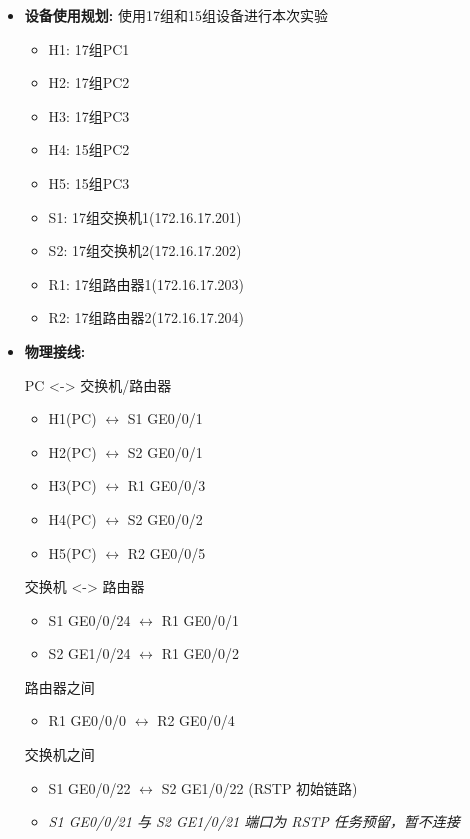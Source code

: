 \documentclass[12pt, a4paper]{article}
\begin{document}
\begin{itemize}
    \item \textbf{设备使用规划:}
    使用17组和15组设备进行本次实验
    \begin{itemize}
        \item H1: 17组PC1
        \item H2: 17组PC2
        \item H3: 17组PC3
        \item H4: 15组PC2
        \item H5: 15组PC3
        \item S1: 17组交换机1(172.16.17.201)
        \item S2: 17组交换机2(172.16.17.202)
        \item R1: 17组路由器1(172.16.17.203)
        \item R2: 17组路由器2(172.16.17.204)
    \end{itemize}
    \item \textbf{物理接线:}
    
    PC <-> 交换机/路由器
    \begin{itemize}
        \item H1(PC) $\leftrightarrow$ S1 GE0/0/1
        \item H2(PC) $\leftrightarrow$ S2 GE0/0/1
        \item H3(PC) $\leftrightarrow$ R1 GE0/0/3
        \item H4(PC) $\leftrightarrow$ S2 GE0/0/2
        \item H5(PC) $\leftrightarrow$ R2 GE0/0/5
    \end{itemize}
    
    交换机 <-> 路由器
    \begin{itemize}
        \item S1 GE0/0/24 $\leftrightarrow$ R1 GE0/0/1
        \item S2 GE1/0/24 $\leftrightarrow$ R1 GE0/0/2
    \end{itemize}
    
    路由器之间
    \begin{itemize}
        \item R1 GE0/0/0 $\leftrightarrow$ R2 GE0/0/4
    \end{itemize}
    
    交换机之间
    \begin{itemize}
        \item S1 GE0/0/22 $\leftrightarrow$ S2 GE1/0/22 (RSTP 初始链路)
        \item \textit{S1 GE0/0/21 与 S2 GE1/0/21 端口为 RSTP 任务预留，暂不连接}
    \end{itemize}
    

\end{itemize}
\end{document}
